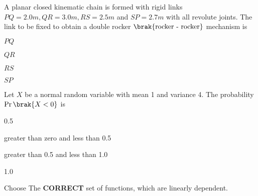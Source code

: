     \item[23.] A planar closed kinematic chain is formed with rigid links $PQ = 2.0m, QR = 3.0m, RS = 2.5m$ and
        $SP = 2.7m$ with all revolute joints. The link to be fixed to obtain a double rocker $\brak{\textnormal{rocker - rocker}}$
        mechanism is
        \hfill{}
        \begin{enumerate}
                \begin{multicols}{4}
                \item $PQ$ 
                \item $QR$
                \item $RS$
                \item $SP$ 
                \end{multicols}
        \end{enumerate}
    \item[24.] Let $X$ be a normal random variable with mean 1 and variance 4. The 
        probability $\Pr\brak{X < 0}$ is 
        \hfill{}
        \begin{enumerate}
                \begin{multicols}{2}
                \item 0.5 \columnbreak
                \item greater than zero and less than 0.5
                \end{multicols}
                \begin{multicols}{2}
                \item greater than 0.5 and less than 1.0\columnbreak
                \item 1.0
                \end{multicols}
        \end{enumerate}

    \item[25.] Choose The \textbf{CORRECT} set of functions, which are linearly dependent. 
        \hfill{}

